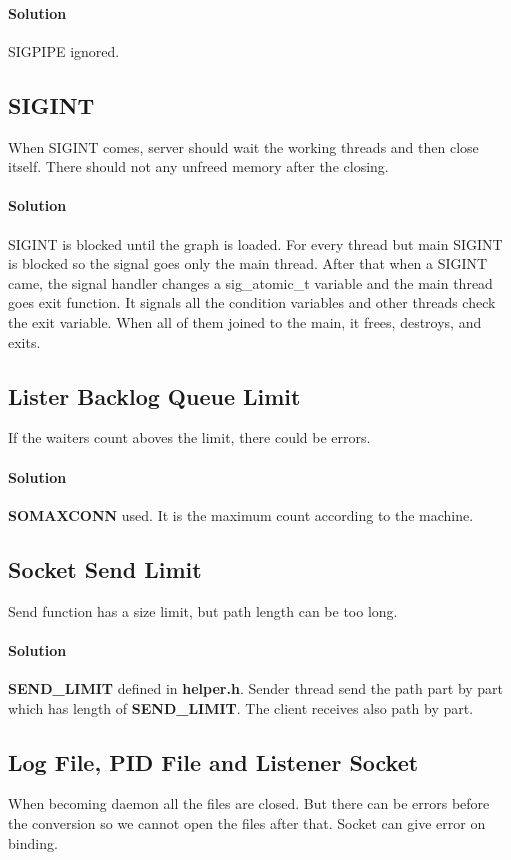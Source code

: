 \documentclass[11pt]{scrartcl} %
\begin{document}
\paragraph{Solution}
SIGPIPE ignored.

\subsection{SIGINT}
When SIGINT comes, server should wait the working threads and then close itself. There should not any unfreed memory after the closing.
\paragraph{Solution}
SIGINT is blocked until the graph is loaded. For every thread but main SIGINT is blocked so the signal goes only the main thread. After that when a SIGINT came, the signal handler changes a sig\_atomic\_t variable and the main thread goes exit function. It signals all the condition variables and other threads check the exit variable. When all of them joined to the main, it frees, destroys, and exits.

\subsection{Lister Backlog Queue Limit}
If the waiters count aboves the limit, there could be errors.
\paragraph{Solution}
\textbf{SOMAXCONN} used. It is the maximum count according to the machine.

\subsection{Socket Send Limit}
Send function has a size limit, but path length can be too long.
\paragraph{Solution}
\textbf{SEND\_LIMIT} defined in \textbf{helper.h}. Sender thread send the path part by part which has length of \textbf{SEND\_LIMIT}. The client receives also path by part.

\subsection{Log File, PID File and Listener Socket}
When becoming daemon all the files are closed. But there can be errors before the conversion so we cannot open the files after that. Socket can give error on binding.
\end{document}
